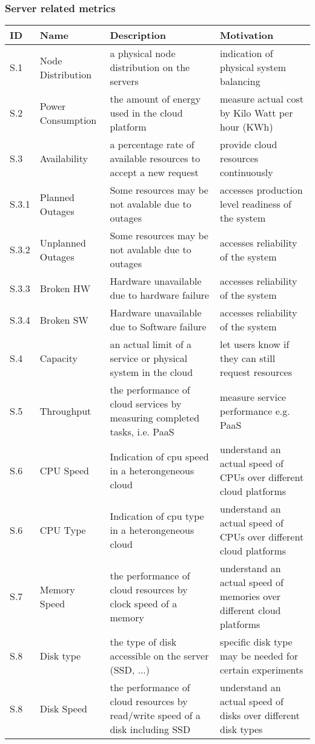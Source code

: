 \documentclass{beamer}
\newcommand{\eTABLE}{\end{tabular}
\end{center}
\end{scriptsize}
}
\newcommand{\bTABLE}[2]{
\frametitle{#1}
\bigskip
\begin{scriptsize}
\begin{center}
\begin{tabular}{lp{0.15\textwidth}p{0.3\textwidth}p{0.4\textwidth}}
\hline
\rowcolor{blue!20} \bf ID & \bf Name & \bf Description & \bf Motivation \\
\hline}
\newenvironment{METRICTABLE}[2] {\bTABLE{#1}{#2}}{\eTABLE}
\begin{document}
\begin{frame}[shrink]
\begin{METRICTABLE}{Server related metrics}{T:server}
S.1 &  Node Distribution       & a physical node distribution on the servers &  indication of physical system balancing \\ \hline
S.2 & Power Consumption     & the amount of energy used in the cloud platform & measure actual cost by Kilo Watt per hour (KWh) \\ \hline
S.3 & Availability                   & a percentage rate of available resources to accept a new request & provide cloud resources continuously \\ \hline
S.3.1 & Planned Outages                 & Some resources may be not avalable due to outages & accesses production level readiness of the system \\ \hline
S.3.2 & Unplanned Outages                 & Some resources may be not avalable due to outages & accesses reliability of the system \\ \hline
S.3.3 & Broken HW                      & Hardware unavailable due to hardware failure & accesses reliability of the system \\ \hline
S.3.4 & Broken SW                      & Hardware unavailable due to Software failure & accesses reliability of the system \\ \hline
S.4 & Capacity                       & an actual limit of a service or physical system in the cloud & let users know if they can still request resources \\ \hline
S.5 & Throughput                 & the performance of cloud services by measuring completed tasks, i.e. PaaS & measure service performance e.g. PaaS \\ \hline
S.6 & CPU Speed                   & Indication of cpu speed in a heterongeneous cloud & understand an actual speed of CPUs over different cloud platforms \\ \hline
S.6 & CPU Type                   & Indication of cpu type in a heterongeneous cloud & understand an actual speed of CPUs over different cloud platforms \\ \hline
S.7 & Memory Speed & the performance of cloud resources by clock speed of a memory & understand an actual speed of memories over different cloud platforms \\ \hline
S.8 & Disk type    & the type of disk accessible on the server (SSD, ...)  & specific disk type may be needed for certain experiments \\ \hline 
S.8 & Disk Speed & the performance of cloud resources by read/write speed of a disk including SSD & understand an actual speed of disks over different disk types \\
\end{METRICTABLE}
\end{frame}
\end{document}
